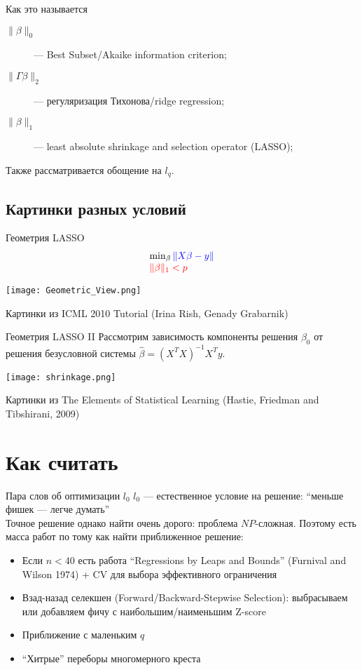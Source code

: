 \documentclass[14pt, fleqn, xcolor={dvipsnames, table}]{beamer}
\begin{document}
\begin{frame}{Как это называется}
\begin{description}
  \item[$\|\beta\|_0$] --- Best Subset/Akaike information criterion;
  \item[$\|\Gamma\beta\|_2$] --- регуляризация Тихонова/ridge regression;
  \item[$\|\beta\|_1$] --- least absolute shrinkage and selection operator (LASSO);
\end{description}
Также рассматривается обощение на $l_q$.
\end{frame}

\subsection{Картинки разных условий}

\begin{frame}{Геометрия LASSO}
$$\begin{array}{l}
\min_\beta {\color{blue} \|X\beta - y\|} \\
{\color{red} \|\beta\|_1 < p}
\end{array}$$
\begin{center}
\texttt{[image: Geometric\_View.png]} 
\end{center}
\footnotesize
Картинки из ICML 2010 Tutorial (Irina Rish, Genady Grabarnik)
\end{frame}

\begin{frame}{Геометрия LASSO II}
\small
Рассмотрим зависимость компоненты решения $\beta_0$ от решения безусловной системы $\hat{\beta} = \left(X^TX\right)^{-1}X^Ty$.
\begin{center}
\texttt{[image: shrinkage.png]} 
\end{center}
\footnotesize
Картинки из The Elements of Statistical Learning (Hastie, Friedman and Tibshirani, 2009)
\end{frame}

\section{Как считать}
\begin{frame}{Пара слов об оптимизации $l_0$}
\small
$l_0$ --- естественное условие на решение: ``меньше фишек --- легче думать'' \\
Точное решение однако найти очень дорого: проблема $NP$-сложная. Поэтому есть масса работ по тому как найти приближенное решение:
\begin{itemize}
  \item Если $n < 40$ есть работа ``Regressions by Leaps and Bounds'' (Furnival and Wilson 1974) + CV для выбора эффективного ограничения
  \item Взад-назад селекшен (Forward/Backward-Stepwise Selection): выбрасываем или добавляем фичу с наибольшим/наименьшим Z-score
  \item Приближение с маленьким $q$
  \item ``Хитрые'' переборы многомерного креста
\end{itemize}
\end{frame}
\end{document}
